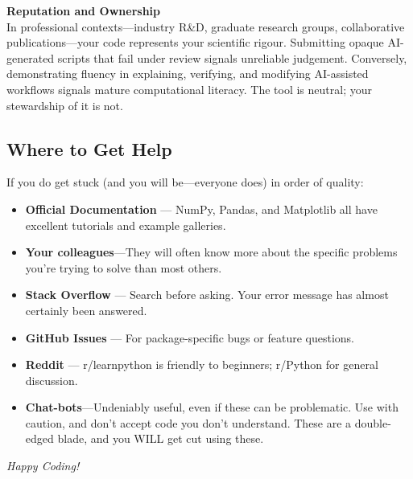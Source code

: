 \begin{warning}
\textbf{Reputation and Ownership} \\
In professional contexts---industry R\&D, graduate research groups, collaborative publications---your code represents your scientific rigour. Submitting opaque AI-generated scripts that fail under review signals unreliable judgement. Conversely, demonstrating fluency in explaining, verifying, and modifying AI-assisted workflows signals mature computational literacy. The tool is neutral; your stewardship of it is not.
\end{warning}

\subsection{Where to Get Help}
If you do get stuck (and you will be---everyone does) in order of quality:
\begin{itemize}
    \item \textbf{Official Documentation} --- NumPy, Pandas, and Matplotlib all have excellent tutorials and example galleries.
	\item \textbf{Your colleagues}---They will often know more about the specific problems you're trying to solve than most others.
    \item \textbf{Stack Overflow} --- Search before asking. Your error message has almost certainly been answered.
    \item \textbf{GitHub Issues} --- For package-specific bugs or feature questions.
    \item \textbf{Reddit} --- r/learnpython is friendly to beginners; r/Python for general discussion.
	\item \textbf{Chat-bots}---Undeniably useful, even if these can be problematic. Use with caution, and don't accept code you don't understand. These are a double-edged blade, and you WILL get cut using these.
\end{itemize}

\vfill
\begin{center}
    \textit{Happy Coding!}
\end{center}